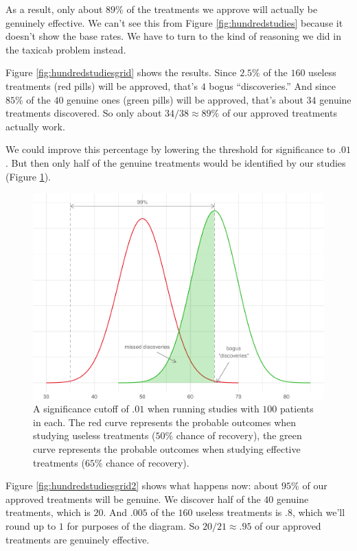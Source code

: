 \documentclass[justified]{tufte-book}
\theoremstyle{definition}
\theoremstyle{definition}
\theoremstyle{definition}
\theoremstyle{definition}
\theoremstyle{remark}
\begin{document}
As a result, only about \(89\%\) of the treatments we approve will actually be genuinely effective. We can't see this from Figure \ref{fig:hundredstudies} because it doesn't show the base rates. We have to turn to the kind of reasoning we did in the taxicab problem instead.

Figure \ref{fig:hundredstudiesgrid} shows the results. Since \(2.5\%\) of the \(160\) useless treatments (red pills) will be approved, that's \(4\) bogus ``discoveries.'' And since \(85\%\) of the \(40\) genuine ones (green pills) will be approved, that's about \(34\) genuine treatments discovered. So only about \(34/38 \approx 89\%\) of our approved treatments actually work.

We could improve this percentage by lowering the threshold for significance to \(.01\). But then only half of the genuine treatments would be identified by our studies (Figure \ref{fig:hundredstudies2}).

\begin{figure}
\includegraphics{_main_files/figure-latex/hundredstudies2-1} \caption[A significance cutoff of $.01$ when running studies with $100$ patients in each]{A significance cutoff of $.01$ when running studies with $100$ patients in each. The red curve represents the probable outcomes when studying useless treatments ($50\%$ chance of recovery), the green curve represents the probable outcomes when studying effective treatments ($65\%$ chance of recovery).}\label{fig:hundredstudies2}
\end{figure}

Figure \ref{fig:hundredstudiesgrid2} shows what happens now: about \(95\%\) of our approved treatments will be genuine. We discover half of the \(40\) genuine treatments, which is \(20\). And \(.005\) of the \(160\) useless treatments is \(.8\), which we'll round up to \(1\) for purposes of the diagram. So \(20/21 \approx .95\) of our approved treatments are genuinely effective.
\end{document}
